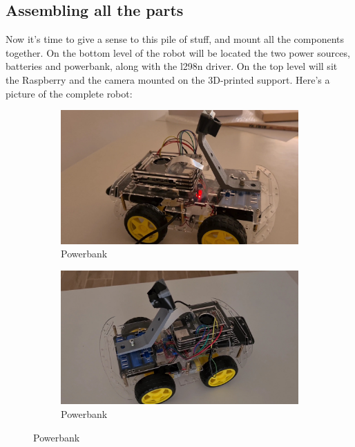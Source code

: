 \documentclass[12pt,a4paper]{article}
\begin{document}
\begin{large}
\subsection{Assembling all the parts}
Now it's time to give a sense to this pile of stuff, and mount all the components together. On the bottom level of the robot will be located the two power sources, batteries and powerbank, along with the l298n driver. On the top level will sit the Raspberry and the camera mounted on the 3D-printed support. Here's a picture of the complete robot:
\begin{figure}[hb]
\centering
\begin{subfigure}{0.4\textwidth}
  \centering
  \includegraphics[width = \textwidth]{images/car1.jpg}
  \caption{Powerbank}
  \label{fig:right}
  \end{subfigure}
\begin{subfigure}{0.4\textwidth}
  \centering
  \includegraphics[width = \textwidth]{images/car2.jpg}
  \caption{Powerbank}
  \label{fig:right}
  \end{subfigure}
\end{figure}


\end{large}
\end{document}
